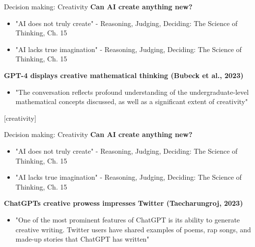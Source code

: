 \documentclass[8pt]{beamer}
\begin{document}
	\begin{frame}[t]{Decision making: Creativity}
		\textbf{Can AI create anything new?}
		\begin{itemize}
			\item "AI does not truly create" - Reasoning, Judging, Deciding: The Science of Thinking, Ch. 15
			\item "AI lacks true imagination" - Reasoning, Judging, Deciding: The Science of Thinking, Ch. 15
		\end{itemize}
		\textbf{GPT-4 displays creative mathematical thinking (Bubeck et al., 2023)}
		\begin{itemize}
			\item "The conversation reflects profound understanding of the undergraduate-level
			mathematical concepts discussed, as well as a significant extent of creativity"
		\end{itemize}
		\vspace{0.5cm}
		\centering
	\end{frame}

	[creativity]

	\begin{frame}[t]{Decision making: Creativity}
		\textbf{Can AI create anything new?}
		\begin{itemize}
			\item "AI does not truly create" - Reasoning, Judging, Deciding: The Science of Thinking, Ch. 15
			\item "AI lacks true imagination" - Reasoning, Judging, Deciding: The Science of Thinking, Ch. 15
		\end{itemize}
		\textbf{ChatGPTs creative prowess impresses Twitter (Taecharungroj, 2023)}
		\begin{itemize}
			\item "One of the most prominent features of ChatGPT is its ability
			to generate creative writing. Twitter users have shared examples
			of poems, rap songs, and made-up stories that ChatGPT has written"
		\end{itemize}
		\vspace{0.3cm}
		\centering
	\end{frame}
\end{document}
